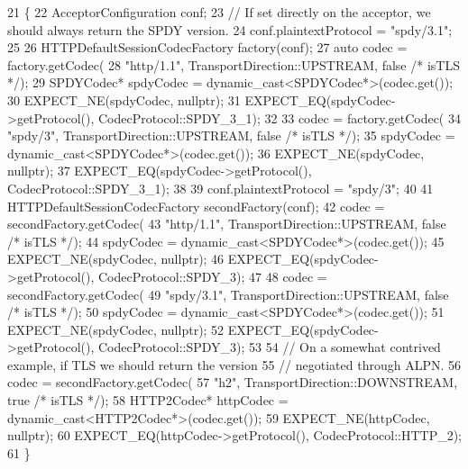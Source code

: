 \begin{DoxyCode}
21                                                        \{
22   AcceptorConfiguration conf;
23   \textcolor{comment}{// If set directly on the acceptor, we should always return the SPDY version.}
24   conf.plaintextProtocol = \textcolor{stringliteral}{"spdy/3.1"};
25 
26   HTTPDefaultSessionCodecFactory factory(conf);
27   \textcolor{keyword}{auto} codec = factory.getCodec(
28       \textcolor{stringliteral}{"http/1.1"}, TransportDirection::UPSTREAM, \textcolor{keyword}{false} \textcolor{comment}{/* isTLS */});
29   SPDYCodec* spdyCodec = \textcolor{keyword}{dynamic\_cast<}SPDYCodec*\textcolor{keyword}{>}(codec.get());
30   EXPECT\_NE(spdyCodec, \textcolor{keyword}{nullptr});
31   EXPECT\_EQ(spdyCodec->getProtocol(), CodecProtocol::SPDY\_3\_1);
32 
33   codec = factory.getCodec(
34       \textcolor{stringliteral}{"spdy/3"}, TransportDirection::UPSTREAM, \textcolor{keyword}{false} \textcolor{comment}{/* isTLS */});
35   spdyCodec = \textcolor{keyword}{dynamic\_cast<}SPDYCodec*\textcolor{keyword}{>}(codec.get());
36   EXPECT\_NE(spdyCodec, \textcolor{keyword}{nullptr});
37   EXPECT\_EQ(spdyCodec->getProtocol(), CodecProtocol::SPDY\_3\_1);
38 
39   conf.plaintextProtocol = \textcolor{stringliteral}{"spdy/3"};
40 
41   HTTPDefaultSessionCodecFactory secondFactory(conf);
42   codec = secondFactory.getCodec(
43       \textcolor{stringliteral}{"http/1.1"}, TransportDirection::UPSTREAM, \textcolor{keyword}{false} \textcolor{comment}{/* isTLS */});
44   spdyCodec = \textcolor{keyword}{dynamic\_cast<}SPDYCodec*\textcolor{keyword}{>}(codec.get());
45   EXPECT\_NE(spdyCodec, \textcolor{keyword}{nullptr});
46   EXPECT\_EQ(spdyCodec->getProtocol(), CodecProtocol::SPDY\_3);
47 
48   codec = secondFactory.getCodec(
49       \textcolor{stringliteral}{"spdy/3.1"}, TransportDirection::UPSTREAM, \textcolor{keyword}{false} \textcolor{comment}{/* isTLS */});
50   spdyCodec = \textcolor{keyword}{dynamic\_cast<}SPDYCodec*\textcolor{keyword}{>}(codec.get());
51   EXPECT\_NE(spdyCodec, \textcolor{keyword}{nullptr});
52   EXPECT\_EQ(spdyCodec->getProtocol(), CodecProtocol::SPDY\_3);
53 
54   \textcolor{comment}{// On a somewhat contrived example, if TLS we should return the version}
55   \textcolor{comment}{// negotiated through ALPN.}
56   codec = secondFactory.getCodec(
57       \textcolor{stringliteral}{"h2"}, TransportDirection::DOWNSTREAM, \textcolor{keyword}{true} \textcolor{comment}{/* isTLS */});
58   HTTP2Codec* httpCodec = \textcolor{keyword}{dynamic\_cast<}HTTP2Codec*\textcolor{keyword}{>}(codec.get());
59   EXPECT\_NE(httpCodec, \textcolor{keyword}{nullptr});
60   EXPECT\_EQ(httpCodec->getProtocol(), CodecProtocol::HTTP\_2);
61 \}
\end{DoxyCode}
